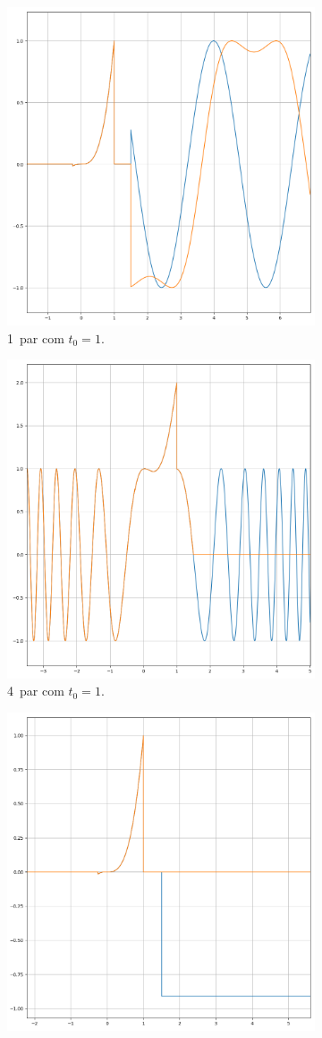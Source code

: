 \begin{figure}[H] 
    \begin{subfigure}[b]{0.5\linewidth}
        \centering
        \includegraphics[width=0.6\linewidth]{prints/par_1.png}
        \caption{1\textordmasculine\ par com \(t_0 = 1\).} 
        \label{fig:par_1} 
    \end{subfigure}%
    \begin{subfigure}[b]{0.5\linewidth}
        \centering
        \includegraphics[width=0.6\linewidth]{prints/par_4.png} 
        \caption{4\textordmasculine\ par com \(t_0 = 1\).} 
        \label{fig:par_4} 
    \end{subfigure} 
        \begin{subfigure}[b]{0.5\linewidth}
        \centering
        \includegraphics[width=0.6\linewidth]{prints/par_5.png}

\end{subfigure}
\end{figure}
